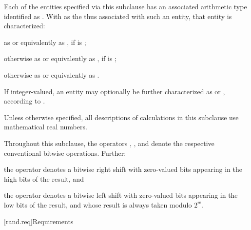 \pnum
{}%
Each of the entities specified via this subclause
has an associated arithmetic type
identified as .
With  as the 
thus associated with such an entity,
that entity is characterized:
\begin{enumeratea}
 \item
   as  or equivalently as ,
   if  is ;
 \item
   otherwise
   as  or equivalently as ,
   if  is ;
 \item
   otherwise
   as  or equivalently as .
\end{enumeratea}
\noindent
If integer-valued,
an entity may optionally be further characterized as
 or ,
according to .

\pnum
Unless otherwise specified,
all descriptions of calculations
in this subclause
use mathematical real numbers.

\pnum
Throughout this subclause,
the operators
\bitand, \bitor, and \xor
denote the respective conventional bitwise operations.
Further:

\begin{enumeratea}
 \item
   the operator \rightshift{} denotes a bitwise right shift
   with zero-valued bits appearing in the high bits of the result, and
 \item
   the operator  denotes a bitwise left shift
   with zero-valued bits appearing in the low bits of the result,
   and whose result is always taken modulo $2^w$.
\end{enumeratea}



[rand.req]{Requirements}%


